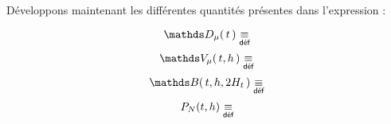 Développons maintenant les différentes quantités présentes dans l'expression :

\begin{equation*}
    {\mathds D_\mu( \, t \, )} \isdef
\end{equation*}
\begin{equation*}
    \mathds V_\mu( \, t, h \, ) \isdef
\end{equation*}
\begin{equation*}
    \mathds B( \, t, h, 2H_t \,) \isdef
\end{equation*}
\begin{equation*}
    P_N(t, h) \isdef
\end{equation*}
\fi
